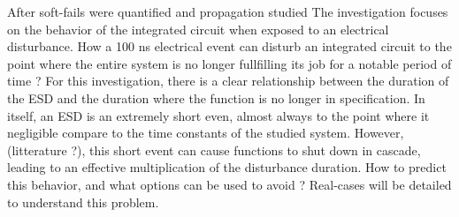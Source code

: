 After soft-fails were quantified and propagation studied
The investigation focuses on the behavior of the integrated circuit when exposed to an electrical disturbance.
How a 100 ns electrical event can disturb an integrated circuit to the point where the entire system is no longer fullfilling its job for a notable period of time ?
For this investigation, there is a clear relationship between the duration of the ESD and the duration where the function is no longer in specification.
In itself, an ESD is an extremely short even, almost always to the point where it negligible compare to the time constants of the studied system.
However, (litterature ?), this short event can cause functions to shut down in cascade, leading to an effective multiplication of the disturbance duration.
How to predict this behavior, and what options can be used to avoid ?
Real-cases will be detailed to understand this problem.
